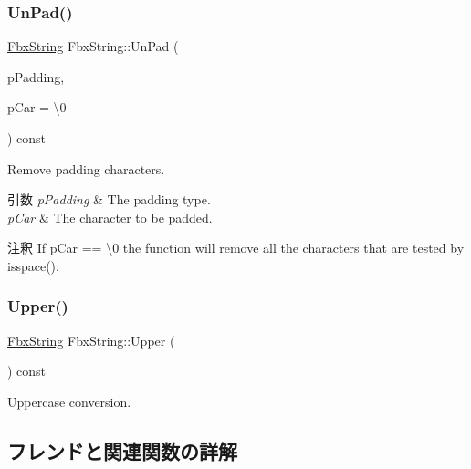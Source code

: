 \subsubsection{\texorpdfstring{Un\+Pad()}{UnPad()}}
{\footnotesize\ttfamily \hyperlink{class_fbx_string}{Fbx\+String} Fbx\+String\+::\+Un\+Pad (\begin{DoxyParamCaption}\item[{\hyperlink{class_fbx_string_aad7bebc948b8205ded9d750ea098ba21}{E\+Padding\+Type}}]{p\+Padding,  }\item[{char}]{p\+Car = {\ttfamily \textquotesingle{}\textbackslash{}0\textquotesingle{}} }\end{DoxyParamCaption}) const}

Remove padding characters. 
\begin{DoxyParams}{引数}
{\em p\+Padding} & The padding type. \\
\hline
{\em p\+Car} & The character to be padded. \\
\hline
\end{DoxyParams}
\begin{DoxyRemark}{注釈}
If p\+Car == \textquotesingle{}\textbackslash{}0\textquotesingle{} the function will remove all the characters that are tested by isspace(). 
\end{DoxyRemark}
\mbox{\label{class_fbx_string_ac8b1171ab4e292c7911f862ed7cc0939}} 
\subsubsection{\texorpdfstring{Upper()}{Upper()}}
{\footnotesize\ttfamily \hyperlink{class_fbx_string}{Fbx\+String} Fbx\+String\+::\+Upper (\begin{DoxyParamCaption}{ }\end{DoxyParamCaption}) const}



Uppercase conversion. 



\subsection{フレンドと関連関数の詳解}
\mbox{\label{class_fbx_string_a2d28339557e99afdfe33ae62c80016c7}} 
